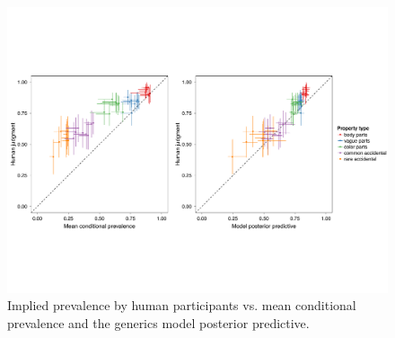\documentclass[10pt,letterpaper]{article}
\begin{document}
\begin{figure}
\centering
    \includegraphics[width=\columnwidth]{implied-byItem-mcp-pp}
    \caption{Implied prevalence by human participants vs. mean conditional prevalence and the generics model posterior predictive.}
  \label{fig:byItemScatter}
\end{figure}
\end{document}
